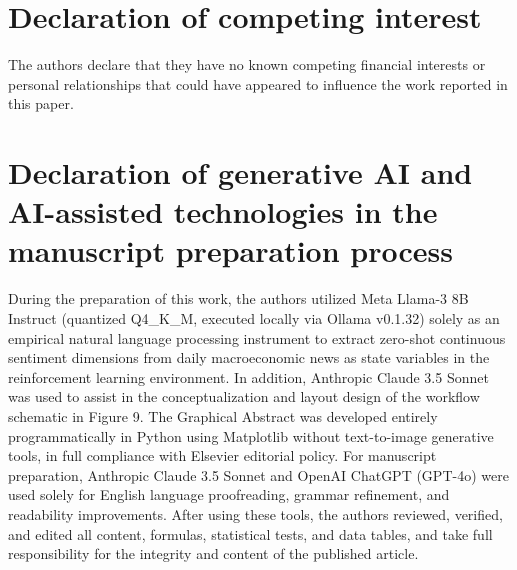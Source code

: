 \documentclass[preprint,12pt]{elsarticle}
\begin{document}
\section*{Declaration of competing interest}
The authors declare that they have no known competing financial interests or personal relationships that could have appeared to influence the work reported in this paper.

\section*{Declaration of generative AI and AI-assisted technologies in the manuscript preparation process}
During the preparation of this work, the authors utilized Meta Llama-3 8B Instruct (quantized Q4\_K\_M, executed locally via Ollama v0.1.32) solely as an empirical natural language processing instrument to extract zero-shot continuous sentiment dimensions from daily macroeconomic news as state variables in the reinforcement learning environment. In addition, Anthropic Claude 3.5 Sonnet was used to assist in the conceptualization and layout design of the workflow schematic in Figure 9. The Graphical Abstract was developed entirely programmatically in Python using Matplotlib without text-to-image generative tools, in full compliance with Elsevier editorial policy. For manuscript preparation, Anthropic Claude 3.5 Sonnet and OpenAI ChatGPT (GPT-4o) were used solely for English language proofreading, grammar refinement, and readability improvements. After using these tools, the authors reviewed, verified, and edited all content, formulas, statistical tests, and data tables, and take full responsibility for the integrity and content of the published article.
\end{document}
